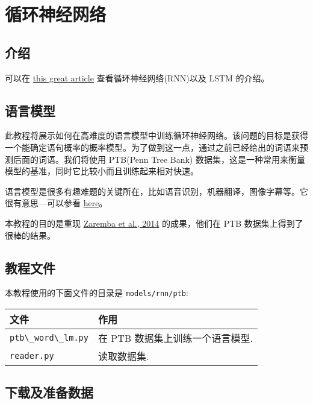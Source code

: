 

\section{循环神经网络 }\label{ux5faaux73afux795eux7ecfux7f51ux7edc}

\subsection{介绍 }\label{ux4ecbux7ecd}

可以在
\href{http://colah.github.io/posts/2015-08-Understanding-LSTMs/}{this
great article} 查看循环神经网络(RNN)以及 LSTM 的介绍。

\subsection{语言模型 }\label{ux8bedux8a00ux6a21ux578b}

此教程将展示如何在高难度的语言模型中训练循环神经网络。该问题的目标是获得一个能确定语句概率的概率模型。为了做到这一点，通过之前已经给出的词语来预测后面的词语。我们将使用
PTB(Penn Tree Bank)
数据集，这是一种常用来衡量模型的基准，同时它比较小而且训练起来相对快速。

语言模型是很多有趣难题的关键所在，比如语音识别，机器翻译，图像字幕等。它很有意思---可以参看
\href{http://karpathy.github.io/2015/05/21/rnn-effectiveness/}{here}。

本教程的目的是重现 \href{http://arxiv.org/abs/1409.2329}{Zaremba et al.,
2014} 的成果，他们在 PTB 数据集上得到了很棒的结果。

\subsection{教程文件 }\label{ux6559ux7a0bux6587ux4ef6}

本教程使用的下面文件的目录是 \lstinline{models/rnn/ptb}:

\begin{longtable}[c]{@{}ll@{}}
\toprule
文件 & 作用\tabularnewline
\midrule
\endhead
\lstinline{ptb\_word\_lm.py} & 在 PTB
数据集上训练一个语言模型.\tabularnewline
\lstinline{reader.py} & 读取数据集.\tabularnewline
\bottomrule
\end{longtable}

\subsection{下载及准备数据
}\label{ux4e0bux8f7dux53caux51c6ux5907ux6570ux636e}

